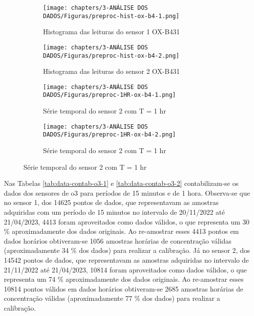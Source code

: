 \begin{figure}[h]
    \centering
    \caption{Histogramas e séries temporais horárias das leituras dos sensores OX-B431}
    \begin{subfigure}{0.495\textwidth}
        \texttt{[image: chapters/3-ANÁLISE DOS DADOS/Figuras/preproc-hist-ox-b4-1.png]}
        \caption{Histograma das leituras do sensor 1 OX-B431}
        \label{fig:data-o3-1-preproc-hist}
    \end{subfigure}
    \hfill
    \begin{subfigure}{0.495\textwidth}
        \texttt{[image: chapters/3-ANÁLISE DOS DADOS/Figuras/preproc-hist-ox-b4-2.png]}
        \caption{Histograma das leituras do sensor 2 OX-B431}
        \label{fig:data-o3-2-preproc-hist}
    \end{subfigure}
    \hfill
    \begin{subfigure}{0.495\textwidth}
        \texttt{[image: chapters/3-ANÁLISE DOS DADOS/Figuras/preproc-1HR-ox-b4-1.png]}
        \caption{Série temporal do sensor 2 com T = 1 hr}
        \label{fig:data-o3-1-preproc-1HR}
    \end{subfigure}
    \hfill
    \begin{subfigure}{0.495\textwidth}
        \texttt{[image: chapters/3-ANÁLISE DOS DADOS/Figuras/preproc-1HR-ox-b4-2.png]}
        \caption{Série temporal do sensor 2 com T = 1 hr}
        \label{fig:data-o3-2-preproc-1HR}
    \end{subfigure}
\end{figure}

Nas Tabelas \ref{tab:data-contab-o3-1} e \ref{tab:data-contab-o3-2} contabilizam-se os dados dos sensores de \acrshort{o3} para períodos de 15 minutos e de 1 hora. Observa-se que no sensor 1, dos 14625 pontos de dados, que representavam as amostras adquiridas com um período de 15 minutos no intervalo de 20/11/2022 até 21/04/2023, 4413 foram aproveitados como dados válidos, o que representa um 30 \% aproximadamente dos dados originais. Ao re-amostrar esses 4413 pontos em dados horários obtiveram-se 1056 amostras horárias de concentração válidas (aproximadamente 34 \% dos dados) para realizar a calibração. Já no sensor 2, dos 14542 pontos de dados, que representavam as amostras adquiridas no intervalo de 21/11/2022 até 21/04/2023, 10814 foram aproveitados como dados válidos, o que representa um 74 \% aproximadamente dos dados originais. Ao re-amostrar esses 10814 pontos válidos em dados horários obtiveram-se 2685 amostras horárias de concentração válidas (aproximadamente 77 \% dos dados) para realizar a calibração.

